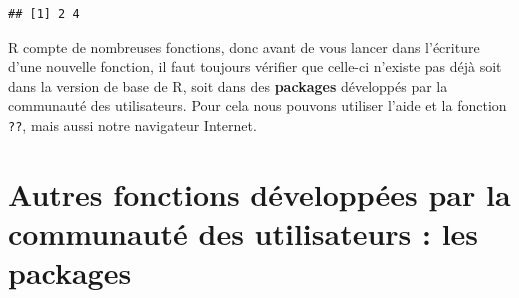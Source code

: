 \documentclass[
]{book}
\newenvironment{Shaded}{\begin{snugshade}}{\end{snugshade}}
\newcommand{\CommentTok}[1]{\textcolor[rgb]{0.56,0.35,0.01}{\textit{#1}}}
\newcommand{\ControlFlowTok}[1]{\textcolor[rgb]{0.13,0.29,0.53}{\textbf{#1}}}
\newcommand{\DataTypeTok}[1]{\textcolor[rgb]{0.13,0.29,0.53}{#1}}
\newcommand{\DecValTok}[1]{\textcolor[rgb]{0.00,0.00,0.81}{#1}}
\newcommand{\KeywordTok}[1]{\textcolor[rgb]{0.13,0.29,0.53}{\textbf{#1}}}
\newcommand{\NormalTok}[1]{#1}
\newcommand{\OperatorTok}[1]{\textcolor[rgb]{0.81,0.36,0.00}{\textbf{#1}}}
\newcommand{\StringTok}[1]{\textcolor[rgb]{0.31,0.60,0.02}{#1}}
\begin{document}
\begin{Shaded}
\end{Shaded}

\begin{verbatim}
## [1] 2 4
\end{verbatim}

R compte de nombreuses fonctions, donc avant de vous lancer dans l'écriture d'une nouvelle fonction, il faut toujours vérifier que celle-ci n'existe pas déjà soit dans la version de base de R, soit dans des \textbf{packages} développés par la communauté des utilisateurs. Pour cela nous pouvons utiliser l'aide et la fonction \texttt{??}, mais aussi notre navigateur Internet.

\hypertarget{autres-fonctions-duxe9veloppuxe9es-par-la-communautuxe9-des-utilisateurs-les-packages}{%
\section{Autres fonctions développées par la communauté des utilisateurs : les packages}\label{autres-fonctions-duxe9veloppuxe9es-par-la-communautuxe9-des-utilisateurs-les-packages}}
\end{document}
